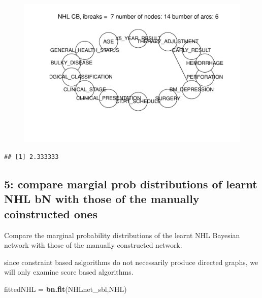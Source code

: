 \documentclass[]{article}
\newenvironment{Shaded}{\begin{snugshade}}{\end{snugshade}}
\newcommand{\KeywordTok}[1]{\textcolor[rgb]{0.13,0.29,0.53}{\textbf{{#1}}}}
\newcommand{\DecValTok}[1]{\textcolor[rgb]{0.00,0.00,0.81}{{#1}}}
\newcommand{\StringTok}[1]{\textcolor[rgb]{0.31,0.60,0.02}{{#1}}}
\newcommand{\NormalTok}[1]{{#1}}
\begin{document}
\begin{figure}[htbp]
\centering
\includegraphics{BN_Ass2_files/figure-latex/unnamed-chunk-6-2.pdf}
\end{figure}

\begin{Shaded}
\end{Shaded}

\begin{verbatim}
## [1] 2.333333
\end{verbatim}

\subsection{5: compare margial prob distributions of learnt NHL bN with
those of the manually coinstructed
ones}\label{compare-margial-prob-distributions-of-learnt-nhl-bn-with-those-of-the-manually-coinstructed-ones}

Compare the marginal probability distributions of the learnt NHL
Bayesian network with those of the manually constructed network.

since constraint based aslgorithms do not necessarily produce directed
graphs, we will only examine score based algorithms.

\begin{Shaded}
\begin{Highlighting}[]
\NormalTok{fittedNHL =}\StringTok{ }\KeywordTok{bn.fit}\NormalTok{(NHLnet_sbl,NHL)}
\end{Highlighting}
\end{Shaded}
\end{document}
